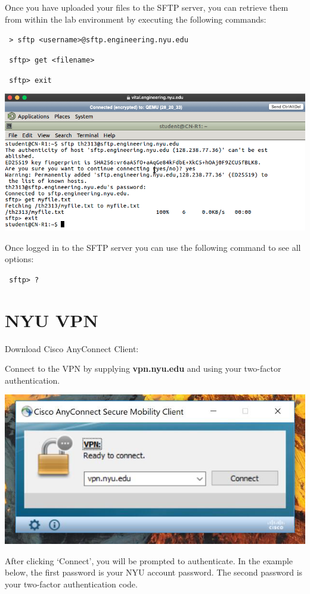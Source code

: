 \documentclass[12pt]{article}
\newcommand{\MYhref}[3][blue]{\href{#2}{\color{#1}{#3}}}%
\begin{document}
Once you have uploaded your files to the SFTP server, you can retrieve them from within the lab environment by executing the following commands:
\begin{adjustwidth}{2.5em}{0pt}
\texttt{
> sftp <username>@sftp.engineering.nyu.edu
}

\texttt{
sftp> get <filename>
}

\texttt{
sftp> exit
}
\end{adjustwidth}
{%
\centering
\includegraphics[width=\linewidth]{sftp2.png}

}

Once logged in to the SFTP server you can use the following command to see all options:
\begin{adjustwidth}{2.5em}{0pt}
\texttt{
sftp> ?
}
\end{adjustwidth}


\iffalse %
\section*{NYU VPN}
Download Cisco AnyConnect Client: \\
\MYhref{https://www.cisco.com/c/en/us/support/security/anyconnect-secure-mobility-client/tsd-products-support-series-home.html}{https://www.cisco.com/c/en/us/support/security/anyconnect-secure-mobility-client/tsd-products-support-series-home.html}

Connect to the VPN by supplying \textbf{vpn.nyu.edu} and using your two-factor authentication. 


{%
\centering
\includegraphics[scale=0.75]{vpn1.png}

}
After clicking ‘Connect’, you will be prompted to authenticate. In the example below, the first password is your NYU account password. The second password is your two-factor authentication code.
\end{document}
